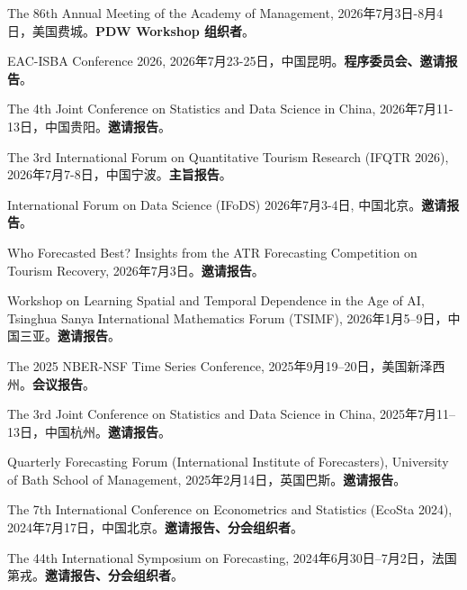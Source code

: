\documentclass[twoside,a4paper,11pt]{article}
\begin{document}
\begin{etaremune}[itemsep=0ex,parsep=0pt]

\item The 86th Annual Meeting of the Academy of Management, 2026年7月3日-8月4日，美国费城。\textbf{PDW Workshop 组织者}。

\item EAC-ISBA Conference 2026, 2026年7月23-25日，中国昆明。\textbf{程序委员会、邀请报告}。

\item The 4th Joint Conference on Statistics and Data Science in China, 2026年7月11-13日，中国贵阳。\textbf{邀请报告}。

\item The 3rd International Forum on Quantitative Tourism Research (IFQTR 2026), 2026年7月7-8日，中国宁波。\textbf{主旨报告}。

\item International Forum on Data Science (IFoDS) 2026年7月3-4日, 中国北京。\textbf{邀请报告}。

\item Who Forecasted Best? Insights from the ATR Forecasting Competition on Tourism Recovery, 2026年7月3日。\textbf{邀请报告}。

\item Workshop on Learning Spatial and Temporal Dependence in the Age of AI, Tsinghua Sanya International Mathematics Forum (TSIMF), 2026年1月5--9日，中国三亚。\textbf{邀请报告}。

\item The 2025 NBER-NSF Time Series Conference, 2025年9月19--20日，美国新泽西州。\textbf{会议报告}。

\item The 3rd Joint Conference on Statistics and Data Science in China, 2025年7月11--13日，中国杭州。\textbf{邀请报告}。

\item Quarterly Forecasting Forum (International Institute of Forecasters), University of Bath School of Management, 2025年2月14日，英国巴斯。\textbf{邀请报告}。

\item The 7th International Conference on Econometrics and Statistics (EcoSta 2024), 2024年7月17日，中国北京。\textbf{邀请报告、分会组织者}。

\item The 44th International Symposium on Forecasting, 2024年6月30日--7月2日，法国第戎。\textbf{邀请报告、分会组织者}。


\end{etaremune}
\end{document}

